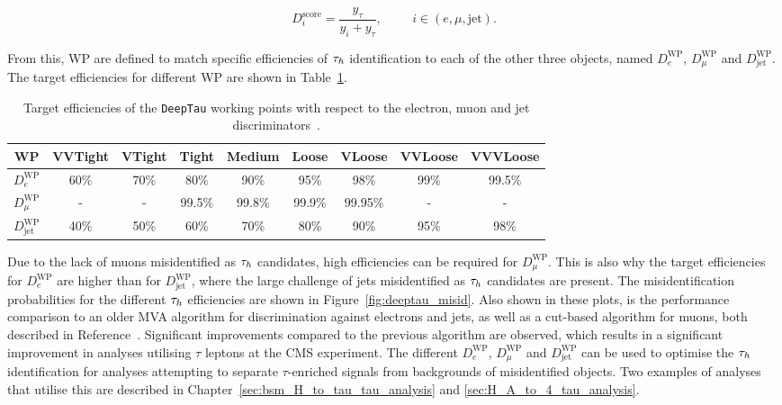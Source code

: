 \begin{equation}
D_{i}^{\text{score}} = \frac{y_\tau}{y_i + y_{\tau}}, \hspace{1cm} i \in (e,\mu,\text{jet}).
\end{equation}

From this, \ac{WP} are defined to match specific efficiencies of $\tau_{h}$ identification to each of the other three objects, named $D_{e}^{\text{WP}}$, $D_{\mu}^{\text{WP}}$ and $D_{\text{jet}}^{\text{WP}}$.
The target efficiencies for different \ac{WP} are shown in Table~\ref{tab:deeptau_eff}. \\

\begin{table}[!hbtp]
\begin{adjustwidth}{-1cm}{-1cm}
\centering
\begin{tabular}{|c|cccccccc|}
\hline
WP                     & VVTight & VTight & Tight  & Medium & Loose  & VLoose  & VVLoose & VVVLoose \\
\hline 
\hline
$D_{e}^{\text{WP}}$    & 60\%    & 70\%   & 80\%   & 90\%   & 95\%   & 98\%    & 99\%    & 99.5\%   \\
$D_{\mu}^{\text{WP}}$  & -       & -      & 99.5\% & 99.8\% & 99.9\% & 99.95\% & -       & -        \\
$D_{\text{jet}}^{\text{WP}}$ & 40\%    & 50\%   & 60\%   & 70\%   & 80\%   & 90\%    & 95\%    & 98\%     \\
\hline
\end{tabular}
\end{adjustwidth}
\caption[Target efficiencies of the \texttt{DeepTau} working points.]{Target efficiencies of the \texttt{DeepTau} working points with respect to the electron, muon and jet discriminators~\cite{CMS:2022prd}.}
\label{tab:deeptau_eff}
\end{table}

Due to the lack of muons misidentified as $\tau_{h}$ candidates, high efficiencies can be required for $D_{\mu}^{\text{WP}}$.
This is also why the target efficiencies for $D_{e}^{\text{WP}}$ are higher than for $D_{\text{jet}}^{\text{WP}}$, where the large challenge of jets misidentified as $\tau_{h}$ candidates are present.
The misidentification probabilities for the different $\tau_{h}$ efficiencies are shown in Figure~\ref{fig:deeptau_misid}.
Also shown in these plots, is the performance comparison to an older \ac{MVA} algorithm for discrimination against electrons and jets, as well as a cut-based algorithm for muons, both described in Reference~\cite{CMS:2018jrd}.
Significant improvements compared to the previous algorithm are observed, which results in a significant improvement in analyses utilising $\tau$ leptons at the \ac{CMS} experiment.
The different $D_{e}^{\text{WP}}$, $D_{\mu}^{\text{WP}}$ and $D_{\text{jet}}^{\text{WP}}$ can be used to optimise the $\tau_{h}$ identification for analyses attempting to separate $\tau$-enriched signals from backgrounds of misidentified objects.
Two examples of analyses that utilise this are described in Chapter~\ref{sec:bsm_H_to_tau_tau_analysis} and \ref{sec:H_A_to_4_tau_analysis}.

